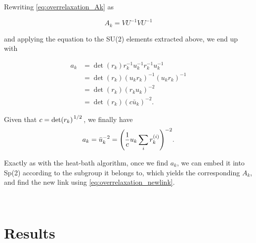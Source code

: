 \documentclass[reqno,12pt]{article}
\numberwithin{equation}{section}
\begin{document}
Rewriting \eqref{eq:overrelaxation_Ak} as

\begin{equation}
	A_k = V U^{-1} V U^{-1}
\end{equation}

and applying the equation to the SU(2) elements extracted above, we end up with

\begin{equation}
	\begin{aligned}
		a_k &= \det(r_k) r_k^{-1} u_k^{-1} r_k^{-1} u_k^{-1} \\
		&= \det(r_k) (u_k r_k)^{-1} (u_k r_k)^{-1} \\
		&= \det(r_k) (r_k u_k)^{-2} \\
		&= \det(r_k) (c \bar{u}_k)^{-2}.
	\end{aligned}
\end{equation}

Given that $c = \det(r_k)^{\flatfrac{1}{2}}$, we finally have
\begin{equation}
	a_k = \bar{u}_k^{-2} = \qty(\frac{1}{c} u_k \sum_i r_k^{(i)})^{-2}.
\end{equation}

Exactly as with the heat-bath algorithm, once we find $a_k$, we can embed it into Sp(2) according to the
subgroup it belongs to, which yields the corresponding $A_k$, and find the new link using \eqref{eq:overrelaxation_newlink}.

\newpage
\thispagestyle{empty}
\

\newpage

\section{Results} \label{results}
\end{document}
